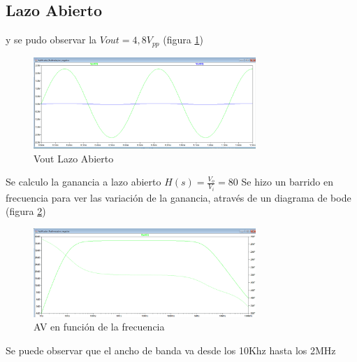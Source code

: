 \documentclass[12pt, letterpaper]{article}
\begin{document}
\subsection{Lazo Abierto}
y se pudo observar la $Vout=4,8V_{pp}$  (figura \ref{fig:sim_Vo})
\begin{figure}[H]
	\centering
	\includegraphics[width=0.75\textwidth]{Imagenes/Av.png}
	\caption{Vout Lazo Abierto}
	\label{fig:sim_Vo}
\end{figure}
Se calculo la ganancia a lazo abierto $H(s)=\frac{V_o}{V_i} = 80$
\singlespacing
Se hizo un barrido en frecuencia para ver las variación de la ganancia, através de un diagrama de bode (figura \ref{fig:bode_lazo_abierto})
\begin{figure}[H]
	\centering
	\includegraphics[width=0.75\textwidth]{Imagenes/lazoAbierto.png}
	\caption{AV en función de la frecuencia}
	\label{fig:bode_lazo_abierto}
\end{figure}
Se puede observar que el ancho de banda va desde los 10Khz hasta los 2MHz
\end{document}
